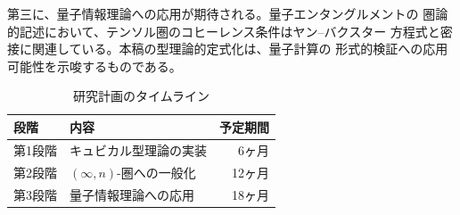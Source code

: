 \documentclass[12pt,a4paper]{article}
\theoremstyle{definition}
\begin{document}
第三に、量子情報理論への応用が期待される。量子エンタングルメントの
圏論的記述において、テンソル圏のコヒーレンス条件はヤン--バクスター
方程式と密接に関連している。本稿の型理論的定式化は、量子計算の
形式的検証への応用可能性を示唆するものである。

\begin{table}[H]
\centering
\caption{研究計画のタイムライン}\label{tab:timeline}
\begin{tabular}{@{}llr@{}}
\toprule
段階 & 内容 & 予定期間 \\
\midrule
第1段階 & キュビカル型理論の実装 & 6ヶ月 \\
第2段階 & $(\infty,n)$-圏への一般化 & 12ヶ月 \\
第3段階 & 量子情報理論への応用 & 18ヶ月 \\
\bottomrule
\end{tabular}
\end{table}
\end{document}
